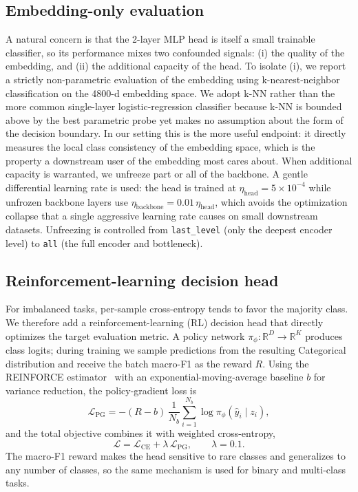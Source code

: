 \documentclass[journal]{IEEEtran}
\begin{document}
\subsection{Embedding-only evaluation}
\label{subsec:embonly}
A natural concern is that the 2-layer MLP head is itself a small trainable classifier, so its performance mixes two confounded signals: (i) the quality of the embedding, and (ii) the additional capacity of the head. To isolate (i), we report a strictly non-parametric evaluation of the embedding using k-nearest-neighbor classification on the 4800-d embedding space.
We adopt k-NN rather than the more common single-layer logistic-regression classifier because k-NN is bounded above by the best parametric probe yet makes no assumption about the form of the decision boundary. In our setting this is the more useful endpoint: it directly measures the local class consistency of the embedding space, which is the property a downstream user of the embedding most cares about.
When additional capacity is warranted, we unfreeze part or all of the backbone.
A gentle differential learning rate is used: the head is trained at
$\eta_{\mathrm{head}}=5\times10^{-4}$ while unfrozen backbone layers use
$\eta_{\mathrm{backbone}}=0.01\,\eta_{\mathrm{head}}$, which avoids the
optimization collapse that a single aggressive learning rate causes on small
downstream datasets. Unfreezing is controlled from \texttt{last\_level} (only
the deepest encoder level) to \texttt{all} (the full encoder and bottleneck).

\subsection{Reinforcement-learning decision head}
For imbalanced tasks, per-sample cross-entropy tends to favor the majority
class. We therefore add a reinforcement-learning (RL) decision head that
directly optimizes the target evaluation metric. A policy network
$\pi_\phi:\mathbb R^{D}\!\to\!\mathbb R^{K}$ produces class logits; during
training we sample predictions from the resulting Categorical distribution and
receive the batch macro-F1 as the reward $R$. Using the REINFORCE
estimator~\cite{he2022rl} with an exponential-moving-average baseline $b$ for
variance reduction, the policy-gradient loss is
\begin{equation}
\mathcal L_{\mathrm{PG}}=-(R-b)\,\frac{1}{N_b}\sum_{i=1}^{N_b}\log \pi_\phi(\hat y_i\mid z_i),
\end{equation}
and the total objective combines it with weighted cross-entropy,
\begin{equation}
\mathcal L=\mathcal L_{\mathrm{CE}}+\lambda\,\mathcal L_{\mathrm{PG}},\qquad \lambda=0.1 .
\end{equation}
The macro-F1 reward makes the head sensitive to rare classes and generalizes to
any number of classes, so the same mechanism is used for binary and multi-class
tasks.
\end{document}
